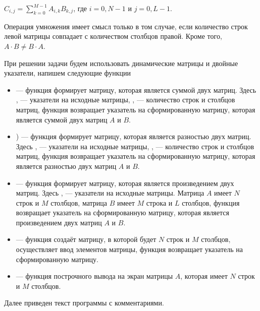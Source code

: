  $C_{i,j}=\sum\limits_{k=0}^{M-1}A_{i,k}B_{k,j}$, где $i = 0, N-1$ и $j = 0, L-1$. 

Операция умножения имеет смысл только в том случае, если количество строк левой матрицы совпадает с количеством столбцов
правой. Кроме того,  $A\cdot B\neq B\cdot A$. 

При решении задачи будем использовать динамические матрицы и двойные указатели, напишем следующие функции

\begin{itemize}
\item {} --- функция формирует матрицу, которая является суммой двух
матриц. Здесь ,  --- указатели на исходные матрицы, ,  --- количество строк и столбцов матриц, функция возвращает
указатель на сформированную матрицу, которая является суммой двух матриц $A$ и $B$.
\item {})  --- функция формирует матрицу, которая является разностью двух
матриц. Здесь ,  --- указатели на исходные матрицы, ,  --- количество строк и столбцов матриц, функция возвращает
указатель на сформированную матрицу, которая является разностью двух матриц $A$ и $B$.
\item {} --- функция формирует матрицу, которая является
произведением двух матриц. Здесь ,  --- указатели на исходные матрицы. 
Матрица $A$ имеет $N$ строк и $M$ столбцов, матрица $B$ имеет $M$ строка и $L$ столбцов, функция возвращает указатель 
на сформированную матрицу, которая является произведением
двух матриц $A$ и $B$.
\item {} --- функция создаёт матрицу, в которой будет $N$ строк и $M$ столбцов, 
осуществляет ввод элементов матрицы, функция возвращает указатель на сформированную матрицу.
\item {} --- функция построчного вывода на экран матрицы $A$, которая 
имеет $N$ строк и $M$ столбцов.
\end{itemize}
Далее приведен текст программы с комментариями.
